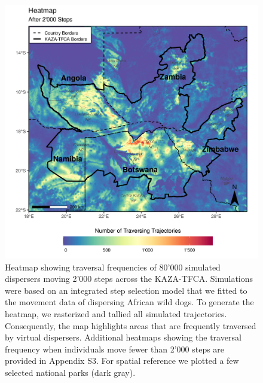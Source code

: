 \documentclass[abstract=on,10pt,a4paper,bibliography=totocnumbered]{article}
\begin{document}
\begin{figure}
  \includegraphics[width=\textwidth]{99_Heatmap.png}
  \caption{Heatmap showing traversal frequencies of 80'000 simulated dispersers
  moving 2'000 steps across the KAZA-TFCA. Simulations were based on an
  integrated step selection model that we fitted to the movement data of
  dispersing African wild dogs. To generate the heatmap, we rasterized and
  tallied all simulated trajectories. Consequently, the map highlights areas
  that are frequently traversed by virtual dispersers. Additional heatmaps
  showing the traversal frequency when individuals move fewer than 2'000 steps
  are provided in Appendix S3. For spatial reference we plotted a few selected
  national parks (dark gray).}
  \label{Heatmap}
\end{figure}
\end{document}
